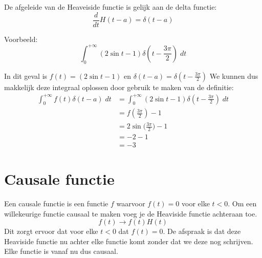 \documentclass[12pt]{report}
\newcommand{\example}[2]{
    \hrulefill
    
    Voorbeeld: #1
    
    #2
    
    \hrulefill
}
\begin{document}
De afgeleide van de Heaveiside functie is gelijk aan de delta functie:
$$\frac{d}{dt}H(t-a) = \delta(t - a)$$
\example{$$\int_{0}^{+\infty} (2\sin t - 1) \delta(t - \frac{3\pi}{2}) \; dt$$}{
In dit geval is $f(t) = (2\sin t - 1)$ en $\delta(t - a) = \delta(t - \frac{3\pi}{2})$
We kunnen dus makkelijk deze integraal oplossen door gebruik te maken van de definitie:
\begin{equation*}
\begin{split}
\int_{0}^{+\infty} f(t) \delta(t- a)\;dt & = \int_{0}^{+\infty} (2\sin t - 1) \delta(t - \frac{3\pi}{2}) \; dt \\
                                        & = f(\frac{3\pi}{2}) - 1  \\
                                        & = 2\sin \bigg(\frac{3\pi}{2}\bigg) - 1 \\
                                        & = -2 - 1 \\
                                        & = - 3
\end{split}
\end{equation*}
}
\section{Causale functie}
Een causale functie is een functie $f$ waarvoor $f(t) = 0$ voor elke $t < 0$.
Om een willekeurige functie causaal te maken voeg je de Heaviside functie achteraan toe.
$$f(t) \rightarrow f(t)H(t)$$
Dit zorgt ervoor dat voor elke $t < 0$ dat $f(t) = 0$. De afspraak is dat deze Heaviside functie nu achter elke functie komt zonder dat we deze nog schrijven. Elke functie is vanaf nu dus causaal.
\end{document}
